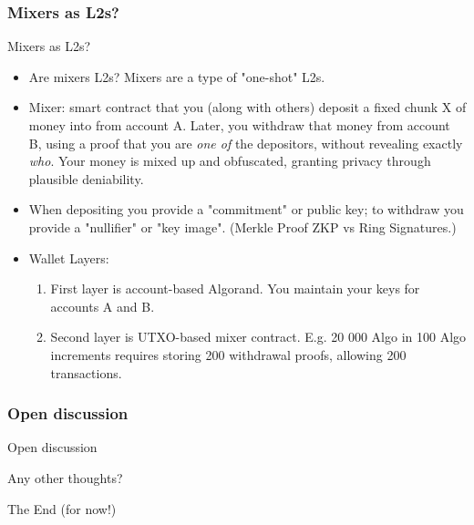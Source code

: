\documentclass[aspectratio=169,xcolor=dvipsnames]{beamer}
\begin{document}
\subsubsection{Mixers as L2s?}
\begin{frame}{Mixers as L2s?}
\begin{itemize}
    \item Are mixers L2s? Mixers are a type of "one-shot" L2s.
    \item Mixer: smart contract that you (along with others) deposit a fixed chunk X of money into from account A. Later, you withdraw that money from account B, using a proof that you are \textit{one of} the depositors, without revealing exactly \textit{who}. Your money is mixed up and obfuscated, granting privacy through plausible deniability.
    \item When depositing you provide a "commitment" or public key; to withdraw you provide a "nullifier" or "key image". (Merkle Proof ZKP vs Ring Signatures.)
    \item Wallet Layers:
    \begin{enumerate}
        \item First layer is account-based Algorand. You maintain your keys for accounts A and B. 
        \item Second layer is UTXO-based mixer contract. E.g. 20 000 Algo in 100 Algo increments requires storing 200 withdrawal proofs, allowing 200 transactions.
    \end{enumerate}
    \end{itemize}
\end{frame}

\subsubsection{Open discussion}
\begin{frame}{Open discussion}
\begin{itemize}
    \Huge{\centerline{Any other thoughts?}}
\end{itemize}
\end{frame}







\begin{frame}
    \Huge{\centerline{The End (for now!)}}
\end{frame}

\end{document}
